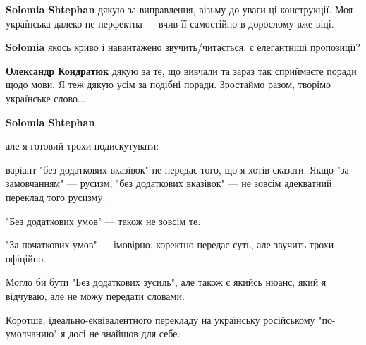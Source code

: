 \begin{itemize}
\begin{itemize}
\textbf{Solomia Shtephan} дякую за виправлення, візьму до уваги ці конструкції. Моя українська далеко не перфектна — вчив її самостійно в дорослому вже віці.

 
\textbf{Solomia} якось криво і навантажено звучить/читається. є елегантніші пропозиції?

 
\textbf{Олександр Кондратюк} дякую за те, що вивчали та зараз так сприймаєте поради щодо мови. Я теж дякую усім за подібні поради. Зростаймо разом, творімо українське слово...

 
\textbf{Solomia Shtephan} 

але я готовий трохи подискутувати:

варіант "без додаткових вказівок" не передає того, що я хотів сказати. Якщо "за
замовчанням" — русизм, "без додаткових вказівок" — не зовсім адекватний
переклад того русизму.

"Без додаткових умов" — також не зовсім те.

"За початкових умов" — імовірно, коректно передає суть, але звучить трохи
офіційно.

Могло би бути "Без додаткових зусиль", але також є якийсь нюанс, який я
відчуваю, але не можу передати словами.

Коротше, ідеально-еквівалентного перекладу на українську російському
"по-умолчанию" я досі не знайшов для себе.

 

\end{itemize}
\end{itemize}
